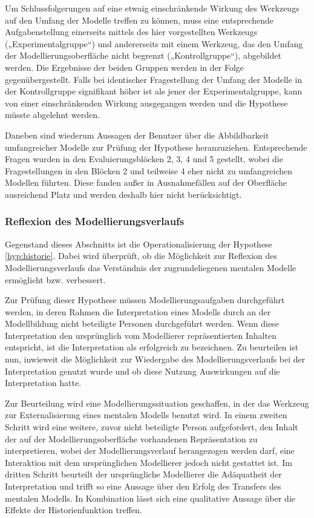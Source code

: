 Um Schlussfolgerungen auf eine etwaig einschränkende Wirkung des Werkzeugs auf den Umfang der Modelle treffen zu können, muss eine entsprechende Aufgabenstellung einerseits mittels des hier vorgestellten Werkzeugs („Experimentalgruppe“) und andererseits mit einem Werkzeug, das den Umfang der Modellierungsoberfläche nicht begrenzt („Kontrollgruppe“), abgebildet werden. Die Ergebnisse der beiden Gruppen werden in der Folge gegenübergestellt. Falls bei identischer Fragestellung der Umfang der Modelle in der Kontrollgruppe signifikant höher ist als jener der Experimentalgruppe, kann von einer einschränkenden Wirkung ausgegangen werden und die Hypothese müsste abgelehnt werden.

Daneben sind wiederum Aussagen der Benutzer über die Abbildbarkeit umfangreicher Modelle zur Prüfung der Hypothese heranzuziehen. Entsprechende Fragen wurden in den Evaluierungsblöcken 2, 3, 4 und 5 gestellt, wobei die Fragestellungen in den Blöcken 2 und teilweise 4 eher nicht zu umfangreichen Modellen führten. Diese fanden außer in Ausnahmefällen auf der Oberfläche ausreichend Platz und werden deshalb hier nicht berücksichtigt.


\subsubsection{Reflexion des Modellierungsverlaufs} %
\label{ssub:reflexion_des_modellierungsverlaufs}

Gegenstand dieses Abschnitts ist die Operationalisierung der Hypothese \ref{hyp:historie}. Dabei wird überprüft, ob die Möglichkeit zur Reflexion des Modellierungsverlaufs das Verständnis der zugrundeliegenen mentalen Modelle ermöglicht bzw. verbessert.

Zur Prüfung dieser Hypothese müssen Modellierungsaufgaben durchgeführt werden, in deren Rahmen die Interpretation eines Modells durch an der Modellbildung nicht beteiligte Personen durchgeführt werden. Wenn diese Interpretation den ursprünglich vom Modellierer repräsentierten Inhalten entspricht, ist die Interpretation als erfolgreich zu bezeichnen. Zu beurteilen ist nun, inwieweit die Möglichkeit zur Wiedergabe des Modellierungsverlaufs bei der Interpretation genutzt wurde und ob diese Nutzung Auswirkungen auf die Interpretation hatte.

Zur Beurteilung wird eine Modellierungssituation geschaffen, in der das Werkzeug zur Externalisierung eines mentalen Modells benutzt wird. In einem zweiten Schritt wird eine weitere, zuvor nicht beteiligte Person aufgefordert, den Inhalt der auf der Modellierungsoberfläche vorhandenen Repräsentation zu interpretieren, wobei der Modellierungsverlauf herangezogen werden darf, eine Interaktion mit dem ursprünglichen Modellierer jedoch nicht gestattet ist. Im dritten Schritt beurteilt der ursprüngliche Modellierer die Adäquatheit der Interpretation und trifft so eine Aussage über den Erfolg des Transfers des mentalen Modells. In Kombination lässt sich eine qualitative Aussage über die Effekte der Historienfunktion treffen.    

